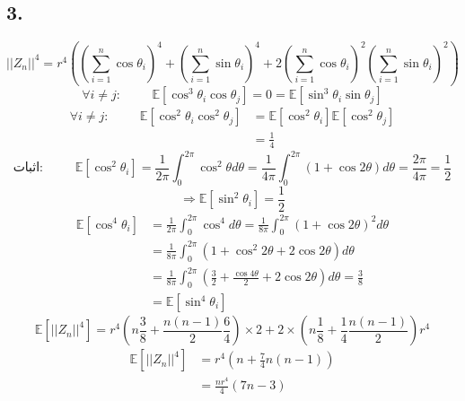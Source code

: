 \documentclass[]{article}
\begin{document}
\subsection{3.}
\begin{equation}
	\nonumber
	||Z_n||^4 = r^4 ((\sum_{i=1}^{n}\cos \theta_i)^4 + (\sum_{i = 1}^{n} \sin \theta_i)^4 + 2 (\sum_{i = 1}^{n}\cos \theta_i)^2 (\sum_{i = 1}^{n}\sin \theta_i)^2)
\end{equation}
\begin{equation}
	\nonumber
	\forall i \neq j: \hspace{1cm} \mathbb{E}[\cos^3 \theta_i \cos \theta_j] = 0 = \mathbb{E}[\sin^3 \theta_i \sin \theta_j]
\end{equation}
\begin{equation}
	\nonumber 
	\begin{split}
			\forall i \neq j: \hspace{1cm} \mathbb{E}[\cos^2 \theta_i \cos^2 \theta_j]& =\mathbb{E}[\cos^2 \theta_i]\mathbb{E}[\cos^2 \theta_j]\\
		& =\frac{1}{4}
	\end{split}
\end{equation}
\begin{equation}
	\nonumber
	\textbf{اثبات}: \hspace{1cm} \mathbb{E}[\cos^2 \theta_i] = \frac{1}{2\pi}\int_{0}^{2\pi} \cos^2 \theta d\theta = \frac{1}{4\pi} \int_{0}^{2\pi} (1+ \cos 2\theta) d\theta = \frac{2\pi}{4\pi} = \frac{1}{2}
\end{equation}
\begin{equation}
	\nonumber
	\Rightarrow \mathbb{E}[\sin^2 \theta_i] = \frac{1}{2}
\end{equation}
\begin{equation}
	\nonumber
	\begin{split}
		\mathbb{E}[\cos^4 \theta_i] 
		&= \frac{1}{2\pi} \int_{0}^{2\pi} \cos^4 d\theta = \frac{1}{8\pi} \int_{0}^{2\pi} (1 + \cos 2\theta)^2 d\theta\\
		&= \frac{1}{8\pi} \int_{0}^{2\pi} (1+ \cos^2 2\theta + 2 \cos 2\theta) d\theta\\ 
		&= \frac{1}{8\pi} \int_{0}^{2\pi} (\frac{3}{2} + \frac{\cos 4\theta}{2} + 2\cos 2\theta) d\theta = \frac{3}{8}\\
		&= \mathbb{E}[\sin^4 \theta_i]
	\end{split}
\end{equation}
\begin{equation}
	\nonumber
	\mathbb{E}[||Z_n||^4] = r^4 (n\frac{3}{8} + \frac{n(n-1)}{2} \frac{6}{4}) \times 2 + 2 \times (n\frac{1}{8} + \frac{1}{4} \frac{n(n-1)}{2})r^4 
\end{equation}
\begin{equation}
	\nonumber
	\begin{split}
		\mathbb{E}[||Z_n||^4] &= r^4 (n + \frac{7}{4}n(n-1))\\
		&= \frac{nr^4}{4} (7n - 3)
	\end{split}
\end{equation}
\newpage
\end{document}
